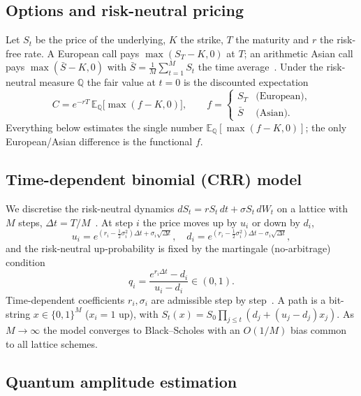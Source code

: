 \documentclass[11pt]{article}
\newcommand{\deltat}{\Delta t}
\newcommand{\E}{\mathbb{E}}
\newcommand{\Q}{\mathbb{Q}}
\begin{document}
\subsection{Options and risk-neutral pricing}

Let $S_t$ be the price of the underlying, $K$ the strike, $T$ the maturity and $r$ the risk-free rate. A European call pays $\max(S_T-K,0)$ at $T$; an arithmetic Asian call pays $\max(\bar S-K,0)$ with $\bar S=\frac1M\sum_{t=1}^M S_{t}$ the time average~\cite{hull2018options}. Under the risk-neutral measure $\Q$ the fair value at $t=0$ is the discounted expectation~\cite{blackscholes1973,glasserman2004monte}
\begin{equation}\label{eq_price}
C = e^{-rT}\,\E_{\Q}\!\big[\max(f-K,0)\big],
\qquad
f = \begin{cases} S_T & \text{(European)},\\[2pt] \bar S & \text{(Asian)}.\end{cases}
\end{equation}
Everything below estimates the single number $\E_\Q[\max(f-K,0)]$; the only European/Asian difference is the functional $f$.

\subsection{Time-dependent binomial (CRR) model}\label{sec_crr}

We discretise the risk-neutral dynamics $dS_t=rS_t\,dt+\sigma S_t\,dW_t$ on a lattice with $M$ steps, $\deltat=T/M$~\cite{COX1979229}. At step $i$ the price moves up by $u_i$ or down by $d_i$,
\begin{equation}
u_i=e^{(r_i-\frac12\sigma_i^2)\deltat+\sigma_i\sqrt{\deltat}},\quad
d_i=e^{(r_i-\frac12\sigma_i^2)\deltat-\sigma_i\sqrt{\deltat}},
\end{equation}
and the risk-neutral up-probability is fixed by the martingale (no-arbitrage) condition
\begin{equation}\label{eq_q}
q_i=\frac{e^{r_i\deltat}-d_i}{u_i-d_i}\in(0,1).
\end{equation}
Time-dependent coefficients $r_i,\sigma_i$ are admissible step by step~\cite{Kim_2017}. A path is a bit-string $x\in\{0,1\}^M$ ($x_i=1$ up), with $S_t(x)=S_0\prod_{j\le t}(d_j+(u_j-d_j)x_j)$. As $M\to\infty$ the model converges to Black--Scholes with an $O(1/M)$ bias common to all lattice schemes.

\subsection{Quantum amplitude estimation}
\end{document}
